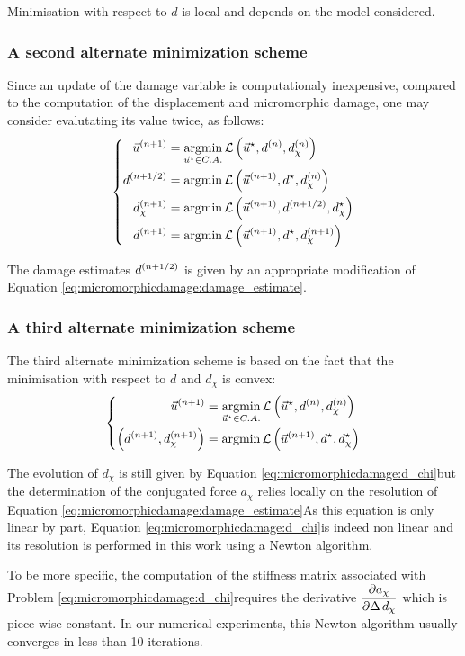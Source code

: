 Minimisation with respect to \(d\) is local and depends on the model
considered.

\subsubsection{A second alternate minimization scheme}

Since an update of the damage variable is computationaly inexpensive,
compared to the computation of the displacement and micromorphic damage,
one may consider evalutating its value twice, as follows:
\[
\left\{
\begin{aligned}
\iter{n+1}{\vec{u}} &= \underset{\vec{u}^{\star}\in C.A.}{\argmin}\, \mathcal{L}\paren{\vec{u}^{\star},\iter{n}{d},\iter{n}{d_{\chi}}}\\
\iter{n+1/2}{d} &= \argmin \,\mathcal{L}\paren{\iter{n+1}{\vec{u}},d^{\star},\iter{n}{d_{\chi}}} \\
\iter{n+1}{d_{\chi}} &= \argmin \,\mathcal{L}\paren{\iter{n+1}{\vec{u}},\iter{n+1/2}{d},d_{\chi}^{\star}} \\
\iter{n+1}{d} &= \argmin \,\mathcal{L}\paren{\iter{n+1}{\vec{u}},d^{\star},\iter{n+1}{d_{\chi}}} \\
\end{aligned}
\right.
\]

The damage estimates \(\iter{n+1/2}{d}\) is given by an appropriate
modification of Equation \eqref{eq:micromorphicdamage:damage_estimate}.

\subsubsection{A third alternate minimization scheme}

The third alternate minimization scheme is based on the fact that the
minimisation with respect to \(d\) and \(d_{\chi}\) is convex:
\[
\left\{
\begin{aligned}
\iter{n+1}{\vec{u}} &= \underset{\vec{u}^{\star}\in C.A.}{\argmin}\, \mathcal{L}\paren{\vec{u}^{\star},\iter{n}{d},\iter{n}{d_{\chi}}}\\
\paren{\iter{n+1}{d},\iter{n+1}{d_{\chi}}} &= \argmin \,\mathcal{L}\paren{\iter{n+1}{\vec{u}},d^{\star},d_{\chi}^{\star}}
\end{aligned}
\right.
\]

The evolution of \(d_{\chi}\) is still given by Equation
\eqref{eq:micromorphicdamage:d_chi}but the determination of the conjugated
force \(a_{\chi}\) relies locally on the resolution of Equation
\eqref{eq:micromorphicdamage:damage_estimate}As this equation is only linear
by part, Equation \eqref{eq:micromorphicdamage:d_chi}is indeed non linear and
its resolution is performed in this work using a Newton algorithm.

To be more specific, the computation of the stiffness matrix associated
with Problem \eqref{eq:micromorphicdamage:d_chi}requires the derivative
\(\deriv{a_{\chi}}{\Delta\,d_{\chi}}\) which is piece-wise constant. In
our numerical experiments, this Newton algorithm usually converges in
less than 10 iterations.